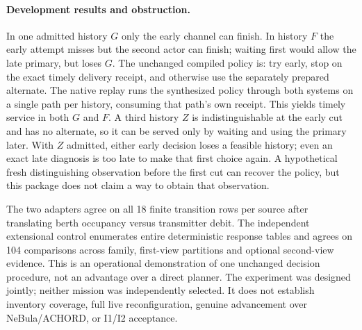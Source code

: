 \documentclass{article}
\begin{document}
\paragraph{Development results and obstruction.}
In one admitted history \(G\) only the early channel can finish. In history \(F\) the early attempt misses but the second actor can finish; waiting first would allow the late primary, but loses \(G\). The unchanged compiled policy is: try early, stop on the exact timely delivery receipt, and otherwise use the separately prepared alternate. The native replay runs the synthesized policy through both systems on a single path per history, consuming that path's own receipt. This yields timely service in both \(G\) and \(F\). A third history \(Z\) is indistinguishable at the early cut and has no alternate, so it can be served only by waiting and using the primary later. With \(Z\) admitted, either early decision loses a feasible history; even an exact late diagnosis is too late to make that first choice again. A hypothetical fresh distinguishing observation before the first cut can recover the policy, but this package does not claim a way to obtain that observation.

The two adapters agree on all 18 finite transition rows per source after translating berth occupancy versus transmitter debit. The independent extensional control enumerates entire deterministic response tables and agrees on 104 comparisons across family, first-view partitions and optional second-view evidence. This is an operational demonstration of one unchanged decision procedure, not an advantage over a direct planner. The experiment was designed jointly; neither mission was independently selected. It does not establish inventory coverage, full live reconfiguration, genuine advancement over NeBula/ACHORD, or I1/I2 acceptance.
\end{document}
